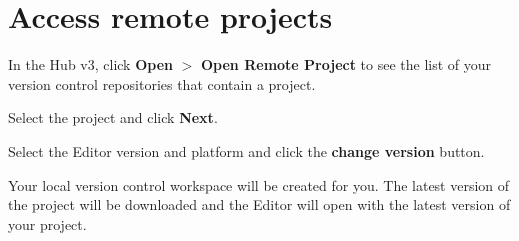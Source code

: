 \chapter{Access remote projects}
\hypertarget{md__hey_tea_9_2_library_2_package_cache_2com_8unity_8collab-proxy_0d2_80_85_2_documentation_0i_2_access_remote_projects}{}\label{md__hey_tea_9_2_library_2_package_cache_2com_8unity_8collab-proxy_0d2_80_85_2_documentation_0i_2_access_remote_projects}
\label{md__hey_tea_9_2_library_2_package_cache_2com_8unity_8collab-proxy_0d2_80_85_2_documentation_0i_2_access_remote_projects_autotoc_md863}%
%

\begin{DoxyEnumerate}
\item In the  Hub v3, click {\bfseries{Open}} \texorpdfstring{$>$}{>} {\bfseries{Open Remote Project}} to see the list of your version control repositories that contain a  project.
\item Select the project and click {\bfseries{Next}}.
\item Select the Editor version and platform and click the {\bfseries{change version}} button.
\item Your local version control workspace will be created for you. The latest version of the project will be downloaded and the Editor will open with the latest version of your  project. 
\end{DoxyEnumerate}